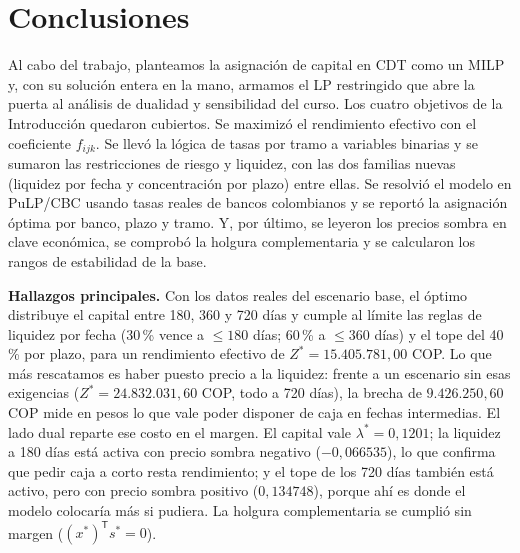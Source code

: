 \documentclass[11pt,a4paper]{article}
\newcommand{\T}{\mathsf{T}}
\begin{document}
\section{Conclusiones}

Al cabo del trabajo, planteamos la asignación de capital en CDT como un MILP y, con su
solución entera en la mano, armamos el LP restringido que abre la puerta al análisis de
dualidad y sensibilidad del curso. Los cuatro objetivos de la Introducción quedaron cubiertos.
Se maximizó el rendimiento efectivo con el coeficiente $f_{ijk}$. Se llevó la lógica de tasas
por tramo a variables binarias y se sumaron las restricciones de riesgo y liquidez, con las dos
familias nuevas (liquidez por fecha y concentración por plazo) entre ellas. Se resolvió el
modelo en PuLP/CBC usando tasas reales de bancos colombianos y se reportó la asignación óptima
por banco, plazo y tramo. Y, por último, se leyeron los precios sombra en clave económica, se
comprobó la holgura complementaria y se calcularon los rangos de estabilidad de la base.

\textbf{Hallazgos principales.} Con los datos reales del escenario base, el óptimo distribuye
el capital entre 180, 360 y 720 días y cumple al límite las reglas de liquidez por fecha
(30\,\% vence a $\le 180$ días; 60\,\% a $\le 360$ días) y el tope del 40\,\% por plazo, para un
rendimiento efectivo de $Z^* = 15.405.781{,}00$ COP. Lo que más rescatamos es haber puesto
precio a la liquidez: frente a un escenario sin esas exigencias ($Z^* = 24.832.031{,}60$ COP,
todo a 720 días), la brecha de $9.426.250{,}60$ COP mide en pesos lo que vale poder disponer de
caja en fechas intermedias. El lado dual reparte ese costo en el margen. El capital vale
$\lambda^* = 0{,}1201$; la liquidez a 180 días está activa con precio sombra negativo
($-0{,}066535$), lo que confirma que pedir caja a corto resta rendimiento; y el tope de los 720
días también está activo, pero con precio sombra positivo ($0{,}134748$), porque ahí es donde el
modelo colocaría más si pudiera. La holgura complementaria se cumplió sin margen
($(x^*)^{\T} s^* = 0$).
\end{document}
